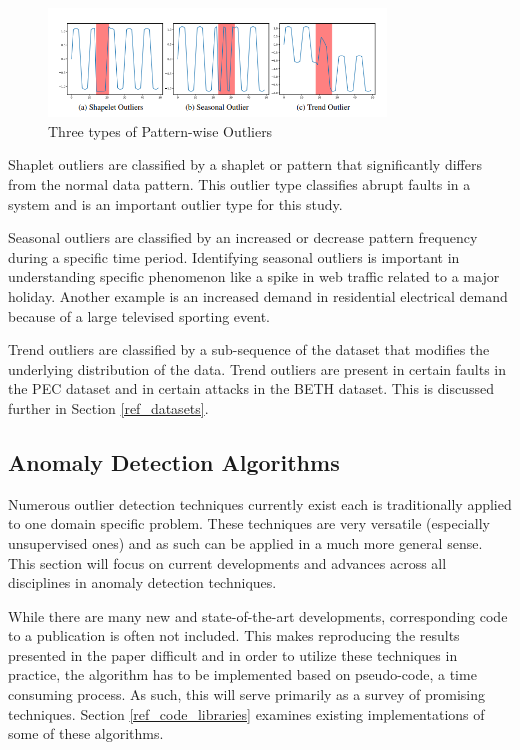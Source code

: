 \begin{figure}[H]
    \includegraphics[width=0.8\textwidth]{Images/contextual_outliers_graphic.PNG}
    \caption{Three types of Pattern-wise Outliers \parencite{lai2021revisiting}}
    \label{fig:contextual-outliers}
\end{figure}
Shaplet outliers are classified by a shaplet or pattern that significantly differs from the normal data pattern. This outlier type classifies abrupt faults in a system and is an important outlier type for this study.

Seasonal outliers are classified by an increased or decrease pattern frequency during a specific time period. Identifying seasonal outliers is important in understanding specific phenomenon like a spike in web traffic related to a major holiday. Another example is an increased demand in residential electrical demand because of a large televised sporting event.

Trend outliers are classified by a sub-sequence of the dataset that modifies the underlying distribution of the data. Trend outliers are present in certain faults in the PEC dataset and in certain attacks in the BETH dataset. This is discussed further in Section \ref{ref_datasets}.

\subsection{Anomaly Detection Algorithms}
\label{ref_anomaly_detection_alg}

Numerous outlier detection techniques currently exist each is traditionally applied to one domain specific problem. These techniques are very versatile (especially unsupervised ones) and as such can be applied in a much more general sense. This section will focus on current developments and advances across all disciplines in anomaly detection techniques.

While there are many new and state-of-the-art developments, corresponding code to a publication is often not included. This makes reproducing the results presented in the paper difficult and in order to utilize these techniques in practice, the algorithm has to be implemented based on pseudo-code, a time consuming process. As such, this will serve primarily as a survey of promising techniques. Section \ref{ref_code_libraries} examines existing implementations of some of these algorithms.

